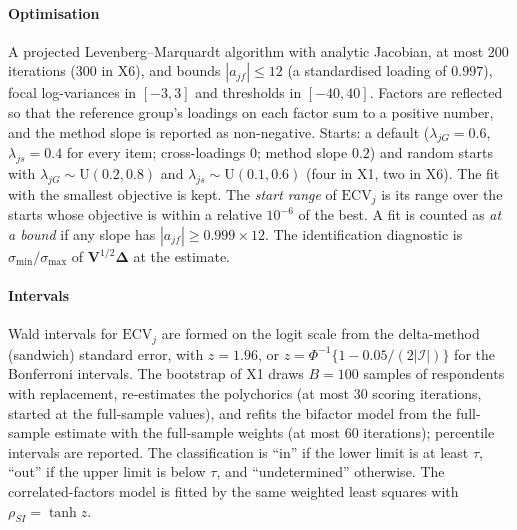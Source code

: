 \paragraph{Optimisation}
A projected Levenberg--Marquardt algorithm with analytic Jacobian, at most 200 iterations (300 in X6), and bounds $|a_{jf}|\le12$ (a standardised loading of $0.997$), focal log-variances in $[-3,3]$ and thresholds in $[-40,40]$. Factors are reflected so that the reference group's loadings on each factor sum to a positive number, and the method slope is reported as non-negative. Starts: a default ($\lambda_{jG}=0.6$, $\lambda_{js}=0.4$ for every item; cross-loadings $0$; method slope $0.2$) and random starts with $\lambda_{jG}\sim\mathrm U(0.2,0.8)$ and $\lambda_{js}\sim\mathrm U(0.1,0.6)$ (four in X1, two in X6). The fit with the smallest objective is kept. The \emph{start range} of $\mathrm{ECV}_j$ is its range over the starts whose objective is within a relative $10^{-6}$ of the best. A fit is counted as \emph{at a bound} if any slope has $|a_{jf}|\ge0.999\times12$. The identification diagnostic is $\sigma_{\min}/\sigma_{\max}$ of $\bm V^{1/2}\bm\Delta$ at the estimate.

\paragraph{Intervals}
Wald intervals for $\mathrm{ECV}_j$ are formed on the logit scale from the delta-method (sandwich) standard error, with $z=1.96$, or $z=\Phi^{-1}\{1-0.05/(2|\mathcal I|)\}$ for the Bonferroni intervals. The bootstrap of X1 draws $B=100$ samples of respondents with replacement, re-estimates the polychorics (at most 30 scoring iterations, started at the full-sample values), and refits the bifactor model from the full-sample estimate with the full-sample weights (at most 60 iterations); percentile intervals are reported. The classification is ``in'' if the lower limit is at least $\tau$, ``out'' if the upper limit is below $\tau$, and ``undetermined'' otherwise. The correlated-factors model is fitted by the same weighted least squares with $\rho_{SI}=\tanh z$.

